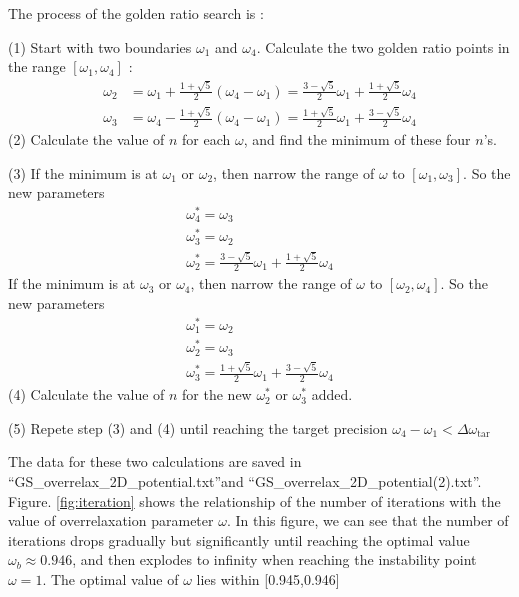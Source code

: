 \documentclass[12pt, graphicx]{article}
\begin{document}
The process of the golden ratio search is : \par
(1) Start with two boundaries $\omega_1$ and $\omega_4$. Calculate the two golden ratio points in the range $[\omega_1,\omega_4]$ : 
\begin{equation}
\begin{aligned}
\omega_2&=\omega_1+\frac{1+\sqrt{5}}{2}(\omega_4-\omega_1)=\frac{3-\sqrt{5}}{2}\omega_1+\frac{1+\sqrt{5}}{2}\omega_4\\
\omega_3&=\omega_4-\frac{1+\sqrt{5}}{2}(\omega_4-\omega_1)=\frac{1+\sqrt{5}}{2}\omega_1+\frac{3-\sqrt{5}}{2}\omega_4
\end{aligned}
\end{equation}
(2) Calculate the value of $n$ for each $\omega$, and find the minimum of these four $n$'s. \par
(3) If the minimum is at $\omega_1$ or $\omega_2$, then narrow the range of $\omega$ to $[\omega_1,\omega_3]$. So the new parameters
\begin{equation}
\begin{gathered}
\omega_4^*=\omega_3\\
\omega_3^*=\omega_2\\
\omega_2^*=\frac{3-\sqrt{5}}{2}\omega_1+\frac{1+\sqrt{5}}{2}\omega_4
\end{gathered}
\end{equation}
If the minimum is at $\omega_3$ or $\omega_4$, then narrow the range of $\omega$ to $[\omega_2,\omega_4]$. So the new parameters
\begin{equation}
\begin{gathered}
\omega_1^*=\omega_2\\
\omega_2^*=\omega_3\\
\omega_3^*=\frac{1+\sqrt{5}}{2}\omega_1+\frac{3-\sqrt{5}}{2}\omega_4
\end{gathered}
\end{equation}
(4) Calculate the value of $n$ for the new $\omega_2^*$ or $\omega_3^*$ added. \par
(5) Repete step (3) and (4) until reaching the target precision $\omega_4-\omega_1<\Delta\omega_\mathrm{tar}$\par

The data for these two calculations are saved in \textquotedblleft GS\_overrelax\_2D\_potential.txt\textquotedblright and \textquotedblleft GS\_overrelax\_2D\_potential(2).txt\textquotedblright. Figure. \ref{fig:iteration} shows the relationship of the number of iterations with the value of overrelaxation parameter $\omega$. In this figure, we can see that the number of iterations  drops gradually but significantly until reaching the optimal value $\omega_b\approx0.946$, and then explodes to infinity when reaching the instability point $\omega=1$. The optimal value of $\omega$ lies within [0.945,0.946]
\end{document}
